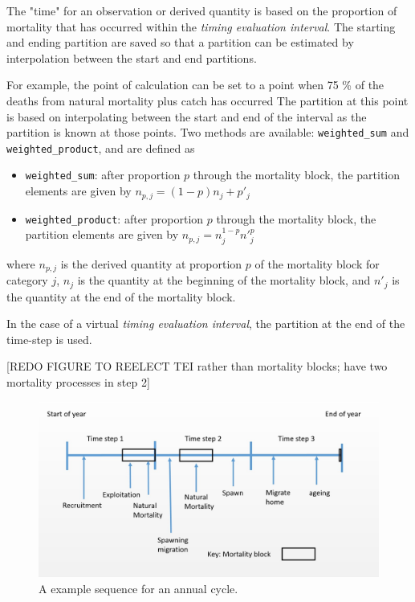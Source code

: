 The "time" for an observation or derived quantity is based on the proportion of mortality that has occurred within the \textit{timing evaluation interval}. The starting and ending partition are saved so that a partition can be estimated by  interpolation between the start and end partitions.

 For example, the point of calculation can be set to a point  when 75 \% of the deaths from natural mortality plus catch has occurred The partition at this point is based on interpolating between the start and end of the interval as the partition is known at those points.  Two  methods are available: \texttt{weighted\_sum} and \texttt{weighted\_product}, and are defined as

\begin{itemize}
	\item \texttt{weighted\_sum}: after proportion $p$ through the mortality block, the partition elements are given by $n_{p,j} = (1 - p)n_j + p'_j$

	\item \texttt{weighted\_product}: after proportion $p$ through the mortality block, the partition elements are given by $n_{p,j} = n_j^{1-p} n'^p_j$
\end{itemize}

where $n_{p,j}$ is the derived quantity at proportion $p$ of the mortality block for category $j$, $n_j$ is the quantity at the beginning of the mortality block, and $n'_j$ is the quantity at the end of the mortality block.

In the case of a virtual \textit{timing evaluation interval}, the partition at the end of the time-step is used. 

[REDO FIGURE TO REELECT TEI rather than mortality blocks; have two mortality processes in step 2]

\begin{figure}[H]
	\centering
	\includegraphics[scale=0.5]{Figures/annual_cycle.jpg}
	\caption{A example sequence for an annual cycle.}\label{Fig:annual}
\end{figure}


